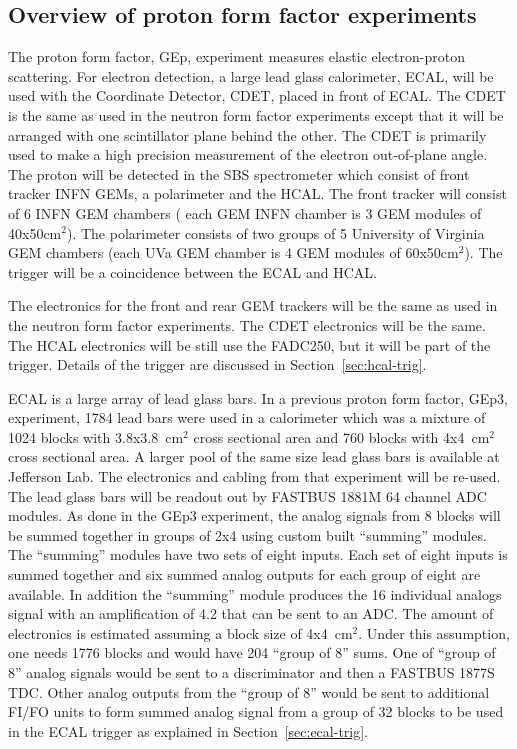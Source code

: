 \documentclass{article}
\begin{document}
\subsection{Overview of proton form factor experiments}
\label{sec:over-pff}
The proton form factor, GEp, experiment measures elastic electron-proton scattering. For electron
detection, a large lead glass calorimeter, ECAL,  will be used with the Coordinate Detector, CDET, placed in front
of ECAL. The CDET is the same as used in the neutron form factor experiments except
that it will be arranged with one scintillator plane behind the other. The CDET is primarily used
to make a high precision measurement of the electron out-of-plane angle. The proton will be
detected in the SBS spectrometer which consist of front tracker INFN GEMs, a polarimeter and the HCAL.
The front tracker will consist of 6 INFN GEM chambers ( each GEM INFN chamber is 3 GEM modules of 40x50cm$^2$).
The polarimeter consists of two groups of 5 University of Virginia GEM chambers (each UVa GEM chamber
is 4 GEM modules of 60x50cm$^2$). The trigger will be a coincidence between the ECAL and HCAL.

The electronics for the front and rear GEM trackers will be the same as used in the neutron form factor 
experiments. The CDET electronics will be the same. The HCAL electronics will be still use the FADC250, but it will be part of the trigger. Details of the trigger are discussed in Section~\ref{sec:hcal-trig}.

ECAL is a large array of lead glass bars. In a previous proton form factor, GEp3,  experiment, 1784 lead bars
were used in a calorimeter which was a mixture of 1024 blocks with 3.8x3.8~cm$^2$ cross sectional area and
760 blocks with 4x4~cm$^2$ cross sectional area. A larger pool of the same size lead glass bars is 
available at Jefferson Lab.
The electronics and cabling from that experiment will be re-used. The 
lead glass bars will be readout out by  FASTBUS 1881M 64 channel ADC modules. As done in the GEp3 experiment,
the analog signals from 8 blocks will be summed together in groups of 2x4 using custom built ``summing'' modules.
The ``summing'' modules have two sets of eight inputs. Each set of eight inputs is summed together
and six summed analog outputs for each group of eight are available. In addition the ``summing'' module 
produces the 16 individual
analogs signal with an amplification of 4.2 that can be sent to an ADC. The amount of electronics is
estimated assuming a block size of 4x4~cm$^2$. Under this assumption, one needs 1776 blocks and would 
have 204 ``group of 8'' sums. One of   ``group of 8'' analog signals would be sent to a discriminator 
and then a FASTBUS 1877S TDC. Other analog outputs from the  ``group of 8'' would be sent to additional
FI/FO units to form summed analog signal from a group of 32 blocks to be used in the ECAL trigger as
explained in Section~\ref{sec:ecal-trig}.
\end{document}
